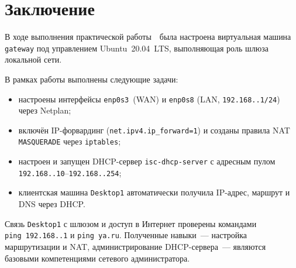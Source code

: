 \chapter*{Заключение}
\label{ch:conclusion}

В ходе выполнения практической работы~\textnumero\,\cfgLabNumber{} была настроена
виртуальная машина \texttt{gateway} под управлением Ubuntu~20.04~LTS,
выполняющая роль шлюза локальной сети.

В рамках работы выполнены следующие задачи:
\begin{itemize}
  \item настроены интерфейсы \texttt{enp0s3}~(WAN) и \texttt{enp0s8}
    (LAN, \texttt{192.168.\cfgLabStudentN.1/24}) через Netplan;
  \item включён IP-форвардинг (\texttt{net.ipv4.ip\_forward=1})
    и созданы правила NAT \texttt{MASQUERADE} через \texttt{iptables};
  \item настроен и запущен DHCP-сервер \texttt{isc-dhcp-server}
    с адресным пулом
    \texttt{192.168.\cfgLabStudentN.10}--\texttt{192.168.\cfgLabStudentN.254};
  \item клиентская машина \texttt{Desktop1} автоматически получила
    IP-адрес, маршрут и DNS через DHCP.
\end{itemize}

Связь \texttt{Desktop1} с шлюзом и доступ в Интернет проверены командами
\texttt{ping~192.168.\cfgLabStudentN.1} и \texttt{ping~ya.ru}.
Полученные навыки~— настройка маршрутизации и NAT, администрирование
DHCP-сервера~— являются базовыми компетенциями сетевого администратора.
